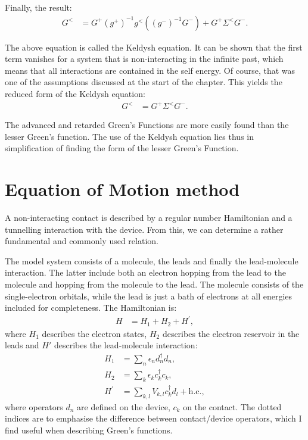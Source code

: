 Finally, the result:
\begin{align}
G^< &= G^+ (g^+)^{-1} g^< \left((g^-)^{-1}G^-  \right) + G^+  \Sigma^< G^-. \label{eq:keldysh}
\end{align}

The above equation is called the Keldysh equation. It can be shown that the first term vanishes for a system that is non\hyp{}interacting in the infinite past, which means that all interactions are contained in the self energy. Of course, that was one of the assumptions discussed at the start of the chapter. This yields the reduced form of the Keldysh equation:
\begin{align*}
G^< &=  G^+ \Sigma^< G^-.
\end{align*}

The advanced and retarded Green's Functions are more easily found than the lesser Green's function. The use of the Keldysh equation lies thus in simplification of finding the form of the lesser Green's Function.

\section{Equation of Motion method}
\label{sec:eommethod}
A non\hyp{}interacting contact is described by a regular number Hamiltonian and a tunnelling interaction with the device. From this, we can determine a rather fundamental and commonly used relation. 

The model system consists of a molecule, the leads and finally the lead-molecule interaction. The latter include both an electron hopping from the lead to the molecule and hopping from the molecule to the lead. The molecule consists of the single-electron orbitals, while the lead is just a bath of electrons at all energies included for completeness. The Hamiltonian is:
\begin{align}
H &= H_1 + H_2 + H^\prime, \label{eq:hamiltonian}
\end{align} 
where $H_1$ describes the electron states, $H_2$ describes the electron reservoir in the leads and $H'$ describes the lead-molecule interaction:
\begin{align*}
H_1 &= \sum_n \epsilon_n d^\dagger_n d_n ,\\
H_2 &= \sum_{k} \epsilon_k c^\dagger_{k} c_{k} ,\\
H^\prime &= \sum_{k, l} V_{k, l} c^\dagger_{k} d_l + \text{h.c.},
\end{align*} where operators $d_n$ are defined on the device, $c_{k}$ on the contact. The dotted indices are to emphasise the difference between contact/device operators, which I find useful when describing Green's functions. 

